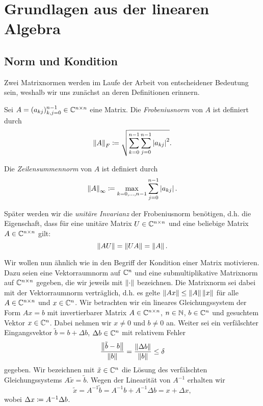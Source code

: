\chapter{Grundlagen aus der linearen Algebra}
\section{Norm und Kondition}
Zwei Matrixnormen werden im Laufe der Arbeit von entscheidener Bedeutung sein,
weshalb wir uns zunächst an deren Definitionen erinnern.

\begin{mydef}
    Sei $A = (a_{kj})_{k,j=0}^{n-1} \in \mathbb{C}^{n\times n}$ eine Matrix.
    Die \emph{Frobeniusnorm} von $A$ ist definiert durch
    \begin{equation}
        \label{eq:frobenius_norm}
        \left\lVert A \right\rVert_F
        \coloneqq \sqrt{ \sum_{k=0}^{n-1} \sum_{j=0}^{n-1} \left\lvert a_{kj} \right\rvert^2}.
    \end{equation}

    \noindent Die \emph{Zeilensummennorm} von $A$ ist definiert durch
    \begin{equation}
        \label{eq:infinity_norm}
        \left\lVert A \right\rVert_\infty
        \coloneqq \max_{k=0, \dots, n-1} \sum_{j=0}^{n-1} \left\lvert a_{kj} \right\rvert.
    \end{equation}
\end{mydef}

\begin{remark}
    Später werden wir die \emph{unitäre Invarianz} der
    Frobeniusnorm benötigen, d.h. die Eigenschaft, dass für eine unitäre Matrix
    $U \in \mathbb{C}^{n\times n}$ und eine beliebige Matrix $A \in \mathbb{C}^{n\times n}$
    gilt:
    \[
        \left\lVert A U \right\rVert = \left\lVert U A \right\rVert = \left\lVert A \right\rVert.
    \]
\end{remark}

Wir wollen nun ähnlich wie in \cite[S. 205ff]{stoer1} den Begriff der Kondition
einer Matrix motivieren.  Dazu seien eine Vektorraumnorm auf $\mathbb{C}^n$ und eine
submultiplikative Matrixnorm auf $\mathbb{C}^{n\times n}$ gegeben, die wir jeweils mit
$\left\lVert \cdot \right\rVert$ bezeichnen. Die Matrixnorm sei dabei mit der Vektorraumnorm
verträglich, d.h. es gelte $ \left\lVert Ax \right\rVert \leq \left\lVert A \right\rVert\left\lVert x \right\rVert$ für alle $A \in
\mathbb{C}^{n\times n}$ und $x \in \mathbb{C}^n$. Wir betrachten wir ein lineares
Gleichungssystem der
Form
$Ax = b$ mit invertierbarer Matrix
$A \in \mathbb{C}^{n \times n}$, $n \in \mathbb{N}$, $b \in \mathbb{C}^n$
und gesuchtem Vektor $x \in \mathbb{C}^n$.
Dabei nehmen wir $x \neq 0$ und $b \neq 0$ an.
Weiter sei ein verfälschter Eingangsvektor $\tilde{b} = b + \Delta b$,
$\Delta b \in \mathbb{C}^n$ mit relativem Fehler
\[
    \frac{\left\lVert \tilde{b} - b \right\rVert}{\left\lVert b \right\rVert} = \frac{\left\lVert \Delta b \right\rVert}{\left\lVert b \right\rVert} \leq \delta
\]
gegeben.
Wir bezeichnen mit $\tilde{x} \in \mathbb{C}^n$ die Lösung des verfälschten Gleichungssystems
$A \tilde{x} = \tilde{b}$.
Wegen der Linearität von $A^{-1}$ erhalten wir
\[
    \tilde{x} = A^{-1} \tilde{b} = A^{-1} b + A^{-1} \Delta b = x + \Delta x,
\]
wobei $\Delta x \coloneqq A^{-1} \Delta b$.

